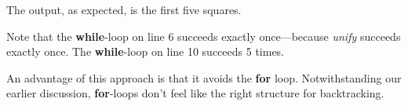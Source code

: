 \begin{itemize}




\smallv
The output, as expected, is the first five squares.


\smallv
Note that the \textbf{while}-loop on line 6 succeeds exactly once---because \textit{unify} succeeds exactly once. The \textbf{while}-loop on line 10 succeeds 5 times.

\smallv
An advantage of this approach is that it avoids the \textbf{for} loop. Notwithstanding our earlier discussion, \textbf{for}-loops don't feel like the right structure for backtracking. 


\end{itemize}
